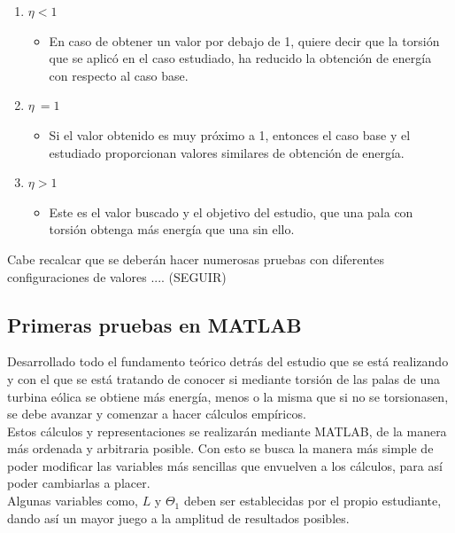 \begin{enumerate}
    \item $\eta < 1$
        \begin{itemize}
            \item En caso de obtener un valor por debajo de 1, quiere decir que la torsión que se aplicó en el caso estudiado, ha reducido la obtención de energía con respecto al caso base. 
        \end{itemize}
    \item $\eta ~= 1$
        \begin{itemize}
            \item Si el valor obtenido es muy próximo a 1, entonces el caso base y el estudiado proporcionan valores similares de obtención de energía.
        \end{itemize}
    \item $\eta > 1$
        \begin{itemize}
            \item Este es el valor buscado y el objetivo del estudio, que una pala con torsión obtenga más energía que una sin ello.
        \end{itemize}
\end{enumerate}

Cabe recalcar que se deberán hacer numerosas pruebas con diferentes configuraciones de valores .... (SEGUIR)
 
\subsection{Primeras pruebas en MATLAB}

Desarrollado todo el fundamento teórico detrás del estudio que se está realizando y con el que se está tratando de conocer si mediante torsión de las palas de una turbina eólica se obtiene más energía, menos o la misma que si no se torsionasen, se debe avanzar y comenzar a hacer cálculos empíricos. \\

Estos cálculos y representaciones se realizarán mediante MATLAB, de la manera más ordenada y arbitraria posible. Con esto se busca la manera más simple de poder modificar las variables más sencillas que envuelven a los cálculos, para así poder cambiarlas a placer. \\

Algunas variables como, $L$ y $\Theta_1$ deben ser establecidas por el propio estudiante, dando así un mayor juego a la amplitud de resultados posibles. \\